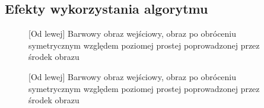 \documentclass[a4paper,12pt, titlepage]{report}
\begin{document}
\subsection*{Efekty wykorzystania algorytmu}
\begin{figure}[h]
    \centering
    \caption{[Od lewej] Barwowy obraz wejściowy, obraz po obróceniu symetrycznym względem poziomej prostej poprowadzonej przez środek obrazu}%
    \label{fig:rysunek}%
\end{figure}
\FloatBarrier
\begin{figure}[h]
    \centering
    \caption{[Od lewej] Barwowy obraz wejściowy, obraz po obróceniu symetrycznym względem poziomej prostej poprowadzonej przez środek obrazu}%
    \label{fig:rysunek}%
\end{figure}
\FloatBarrier
\end{document}
